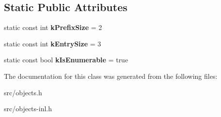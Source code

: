 \subsection*{Static Public Attributes}
\begin{DoxyCompactItemize}
\item 
\hypertarget{classv8_1_1internal_1_1_name_dictionary_shape_a1a90f5c9fdff6b8e651e80362ecaa7c2}{}static const int {\bfseries k\+Prefix\+Size} = 2\label{classv8_1_1internal_1_1_name_dictionary_shape_a1a90f5c9fdff6b8e651e80362ecaa7c2}

\item 
\hypertarget{classv8_1_1internal_1_1_name_dictionary_shape_a4420336fb2913279eebec9f27a8a1334}{}static const int {\bfseries k\+Entry\+Size} = 3\label{classv8_1_1internal_1_1_name_dictionary_shape_a4420336fb2913279eebec9f27a8a1334}

\item 
\hypertarget{classv8_1_1internal_1_1_name_dictionary_shape_aeac8f90c4adc800a7095ae6153b60cfc}{}static const bool {\bfseries k\+Is\+Enumerable} = true\label{classv8_1_1internal_1_1_name_dictionary_shape_aeac8f90c4adc800a7095ae6153b60cfc}

\end{DoxyCompactItemize}


The documentation for this class was generated from the following files\+:\begin{DoxyCompactItemize}
\item 
src/objects.\+h\item 
src/objects-\/inl.\+h\end{DoxyCompactItemize}
